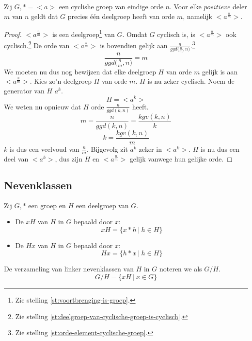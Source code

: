 \documentclass[main.tex]{subfiles}
\begin{document}
\begin{st}
  Zij $G,* = <a>$ een cyclishe groep van eindige orde $n$.
  Voor elke $positieve$ deler $m$ van $n$ geldt dat $G$ precies \'e\'en deelgroep heeft van orde $m$, namelijk $<a^{\frac{n}{m}}>$.
  \begin{proof}
    $<a^{\frac{n}{m}}>$ is een deelgroep\footnote{Zie stelling \ref{st:voortbrenging-is-groep}.} van $G$.
    Omdat $G$ cyclisch is, is $<a^{\frac{n}{m}}>$ ook cyclisch.\footnote{Zie stelling \ref{st:deelgroep-van-cyclische-groep-is-cyclisch}.} De orde van $<a^{\frac{n}{m}}>$ is bovendien gelijk aan $\frac{n}{ggd({\frac{n}{m},n)}}$.\footnote{Zie stelling \ref{st:orde-element-cyclische-groep}.}
    \[ \frac{n}{ggd({\frac{n}{m},n)}} = m \]
    We moeten nu dus nog bewijzen dat elke deelgroep $H$ van orde $m$ gelijk is aan $<a^{\frac{n}{m}}>$.
    Kies zo'n deelgroep $H$ van orde $m$. $H$ is nu zeker cyclisch.
    Noem de generator van $H$ $a^{k}$.
    \[ H = <a^{k}> \]
    We weten nu opnieuw dat $H$ orde $\frac{n}{ggd(k,n)}$ heeft.
    \[ m = \frac{n}{ggd(k,n)} = \frac{kgv(k,n)}{k} \]
    \[ k = \frac{kgv(k,n)}{m} \]
    $k$ is dus een veelvoud van $\frac{n}{m}$.
    Bijgevolg zit $a^{k}$ zeker in $<a^{k}>$.
    $H$ is nu dus een deel van $<a^{k}>$, dus zijn $H$ en $<a^{\frac{n}{m}}>$ gelijk vanwege hun gelijke orde.
  \end{proof}
\end{st}

\subsection{Nevenklassen}
\label{sec:nevenklassen}

\begin{de}
  \label{de:nevenklassen}
  Zij $G,*$ een groep en $H$ een deelgroep van $G$.
  \begin{itemize}
  \item De  $xH$ van $H$ in $G$ bepaald door $x$:
    \[ xH = \{ x * h\ |\ h \in H \} \]
  \item De  $Hx$ van $H$ in $G$ bepaald door $x$:
    \[ Hx = \{ h * x\ |\ h \in H \} \]
  \end{itemize}
  De verzameling van linker nevenklassen van $H$ in $G$ noteren we als $G/H$.
  \[ G/H = \{ xH\ |\ x \in G \} \]
\end{de}
\end{document}
